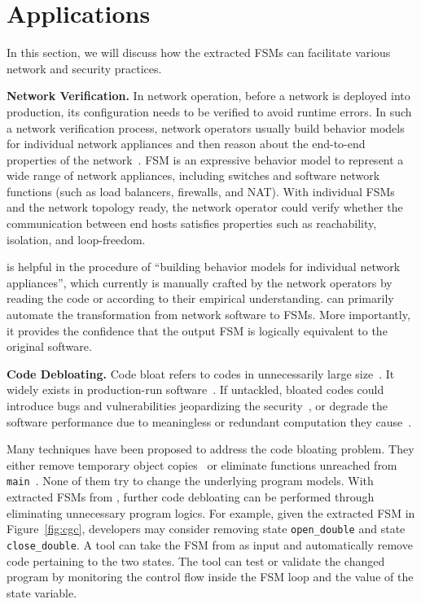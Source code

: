 
\section{Applications}
\label{sec:app}

In this section, we will discuss how the extracted FSMs can facilitate
various network and security practices.


\noindent\textbf{Network Verification.}  In network operation, before a network
is deployed into production, its configuration needs to be verified to avoid
runtime errors. In such a network verification process, network operators
usually build behavior models for individual network appliances and then
reason about the end-to-end properties of the
network~\cite{mai2011debugging,khurshid2013veriflow,kazemian2012header,kazemian2013real,fayaz2016buzz,panda2017verifying}.
FSM is an expressive
behavior model to represent a wide range of network appliances, including
switches and software network functions (such as load balancers, firewalls,
and NAT). With individual FSMs and the network topology ready, the network
operator could verify whether the communication between end hosts satisfies
properties such as reachability, isolation, and loop-freedom.%

\Tool{} is helpful in the procedure of ``building behavior models for
individual network appliances'', which currently is manually crafted by
the network operators by reading the code or according to their
empirical understanding. \Tool{} can primarily automate the
transformation from network software to FSMs. More importantly, it
provides the confidence that the output FSM is logically equivalent
to the original software.


\noindent\textbf{Code Debloating.}
Code bloat refers to codes in unnecessarily large size~\cite{code-bloat}.
It widely exists in production-run software~\cite{code-bloat-study}.
If untackled, bloated codes could introduce bugs and vulnerabilities jeopardizing the security~\cite{protocol-mao},  or
degrade the software performance due to meaningless or redundant computation they
cause~\cite{BloatFSE2008,XuBloatPLDI2009,XuBloatPLDI2010}.

Many techniques have been proposed to address the code bloating problem.
They either remove temporary object copies~\cite{BloatFSE2008,XuBloatPLDI2009,
XuBloatPLDI2010,Reusable,Cachetor}
or eliminate functions unreached from
\texttt{main}~\cite{container-debloating-1,
container-debloating-2, dinghao-1}.
None of them try to change the underlying program models.
With extracted FSMs from \Tool{},
further code debloating can be performed through
eliminating unnecessary program logics.
For example, given the extracted FSM in Figure~\ref{fig:cgc},
developers may consider removing state \texttt{open\_double} and
state \texttt{close\_double}.
A tool can take the FSM from \Tool{} as input and automatically
remove code pertaining to the two states.
The tool can test or validate the changed program
by monitoring the control flow
inside the FSM loop and the value of the state variable.


